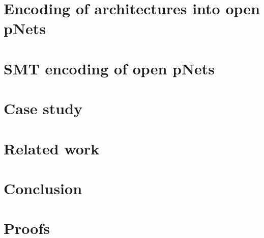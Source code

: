 \documentclass{llncs}
\begin{document}

\section{Encoding of architectures into open pNets}
\label{secn:encoding}


\section{SMT encoding of open pNets}
\label{secn:smt}


\section{Case study}
\label{secn:case-study}


\section{Related work}
\label{secn:related}


\section{Conclusion}
\label{secn:conclusion}





\appendix
\clearpage

\section{Proofs}
\end{document}

